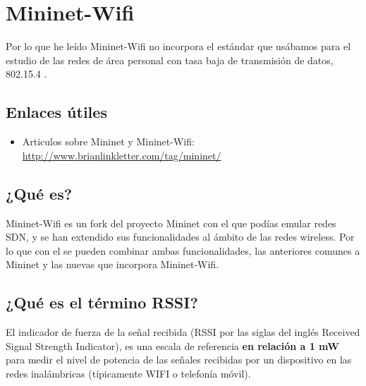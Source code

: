 \chapter{Mininet-Wifi}

Por lo que he leído Mininet-Wifi no incorpora el estándar que usábamos para el estudio de las redes de área personal con tasa baja de transmisión de datos, 802.15.4 .
\section{Enlaces útiles}
\begin{itemize}
    \item Articulos sobre Mininet y Mininet-Wifi: \url{http://www.brianlinkletter.com/tag/mininet/}
    
\end{itemize}


\section{¿Qué es?}


Mininet-Wifi es un fork del proyecto Mininet con el que podías emular redes SDN, y se han extendido sus funcionalidades al ámbito de las redes wireless. Por lo que con el se pueden combinar ambas funcionalidades, las anteriores comunes a Mininet y las nuevas que incorpora Mininet-Wifi.

\section{¿Qué es el término RSSI?}

El indicador de fuerza de la señal recibida (RSSI por las siglas del inglés Received Signal Strength Indicator), es una escala de referencia \textbf{en relación a 1 mW} para medir el nivel de potencia de las señales recibidas por un dispositivo en las redes inalámbricas (típicamente WIFI o telefonía móvil).




